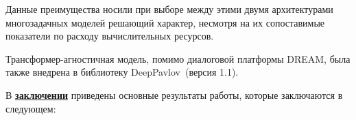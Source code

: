Данные преимущества носили при выборе между этими двумя архитектурами многозадачных моделей решающий характер, несмотря на их сопоставимые показатели по расходу вычислительных ресурсов.

Трансформер-агностичная модель, помимо диалоговой платформы DREAM, была также внедрена в библиотеку DeepPavlov~\cite{dp_2023}(версия 1.1).


В \underline{\textbf{заключении}} приведены основные результаты работы, которые заключаются в следующем:


